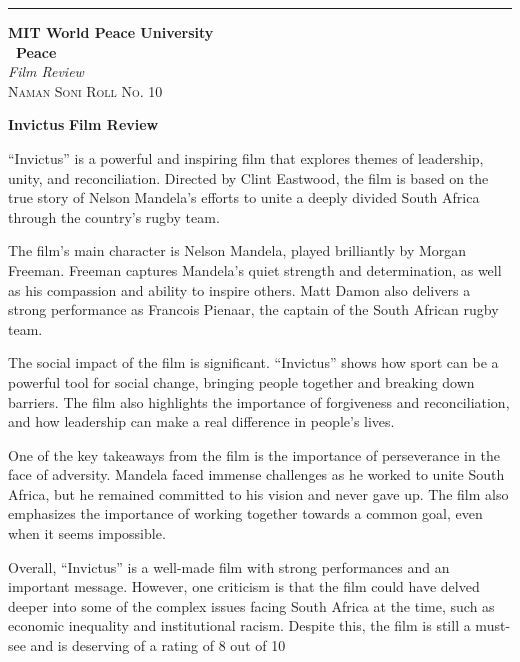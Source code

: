 \documentclass{article}
\begin{document}
\begin{titlepage} %
	
	\raggedleft\rule{1pt}{\textheight} %
	\hspace{0.05\textwidth} %
	\parbox[b]{0.75\textwidth}
	{ %
		
		{\Huge\bfseries MIT World Peace University \\[0.5\baselineskip] \ Peace}\\[2\baselineskip] %
		{\large\textit{Film Review}}\\[4\baselineskip] %
		{\Large\textsc{Naman Soni Roll No. 10}} %
		
		\vspace{0.5\textheight} %
	}
	
\end{titlepage}
\tableofcontents
\pagebreak
\begin{center}
    \textbf{Invictus}
    \textbf{Film Review}
\end{center}
``Invictus'' is a powerful and inspiring film that explores themes of leadership, unity, and reconciliation. Directed by Clint Eastwood, the film is based on the true story of Nelson Mandela's efforts to unite a deeply divided South Africa through the country's rugby team.

The film's main character is Nelson Mandela, played brilliantly by Morgan Freeman. Freeman captures Mandela's quiet strength and determination, as well as his compassion and ability to inspire others. Matt Damon also delivers a strong performance as Francois Pienaar, the captain of the South African rugby team.

The social impact of the film is significant. ``Invictus'' shows how sport can be a powerful tool for social change, bringing people together and breaking down barriers. The film also highlights the importance of forgiveness and reconciliation, and how leadership can make a real difference in people's lives.

One of the key takeaways from the film is the importance of perseverance in the face of adversity. Mandela faced immense challenges as he worked to unite South Africa, but he remained committed to his vision and never gave up. The film also emphasizes the importance of working together towards a common goal, even when it seems impossible.

Overall, ``Invictus'' is a well-made film with strong performances and an important message. However, one criticism is that the film could have delved deeper into some of the complex issues facing South Africa at the time, such as economic inequality and institutional racism. Despite this, the film is still a must-see and is deserving of a rating of 8 out of 10
\end{document}
